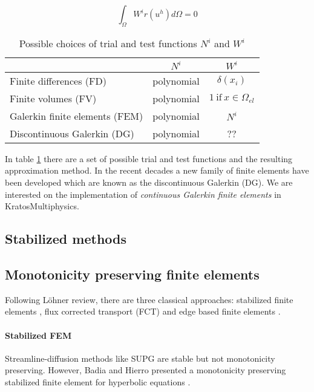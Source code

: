 \begin{equation}
\int_{\Omega} W^ir(u^h)d\Omega = 0
\end{equation}

\begin{table}
\centering
\begin{tabular}{|l|c|c|}
\hline
 & $N^i$ & $W^i$ \\ \hline
Finite differences (FD)         & polynomial & $\delta(x_i)$ \\ \hline
Finite volumes (FV)             & polynomial & $1 \ \text{if} \ x\in\Omega_{el}$ \\ \hline
Galerkin finite elements (FEM)  & polynomial & $N^i$ \\ \hline
Discontinuous Galerkin (DG)     & polynomial & ?? \\ \hline
\end{tabular}
\caption{Possible choices of trial and test functions $N^i$ and $W^i$}
\label{possible_trial_functions}
\end{table}

In table \ref{possible_trial_functions} there are a set of possible trial and test functions and the resulting approximation method. In the recent decades a new family of finite elements have been developed which are known as the discontinuous Galerkin (DG). We are interested on the implementation of \emph{continuous Galerkin finite elements} in KratosMultiphysics.


\subsection{Stabilized methods}



\subsection{Monotonicity preserving finite elements}

Following Löhner review, there are three classical approaches: stabilized finite elements \cite{lohner2008}, flux corrected transport (FCT) \cite{lohner2008ch9} and edge based finite elements \cite{lohner2008ch10}.

\paragraph*{Stabilized FEM} Streamline-diffusion methods like SUPG are stable but not
monotonicity preserving. However, Badia and Hierro presented a monotonicity preserving stabilized finite element for hyperbolic equations \cite{badia2014}.

